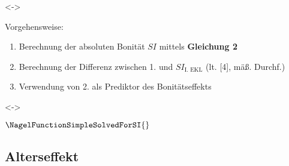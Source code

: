 \begin{frame}[c]
  \visible<\theFirstElement->{Vorgehensweise:
  \begin{enumerate}
  \item Berechnung der absoluten Bonität \(SI\) mittels \textbf{Gleichung 2}
  \item Berechnung der Differenz zwischen 1. und \(SI_{\text{I. EKL}}\) (lt. [4], mäß. Durchf.)
  \item Verwendung von 2. als Prediktor des Bonitätseffekts
  \end{enumerate}}

  \visible<\theFirstElement->{\begin{center}
      \begin{minipage}{0.5\linewidth}
        \centerline{\(\NagelFunctionSimpleSolvedForSI{}\)}
        \vspace{\captiondistance}
      \end{minipage}
    \end{center}}

\end{frame}

\subsection{Alterseffekt}


